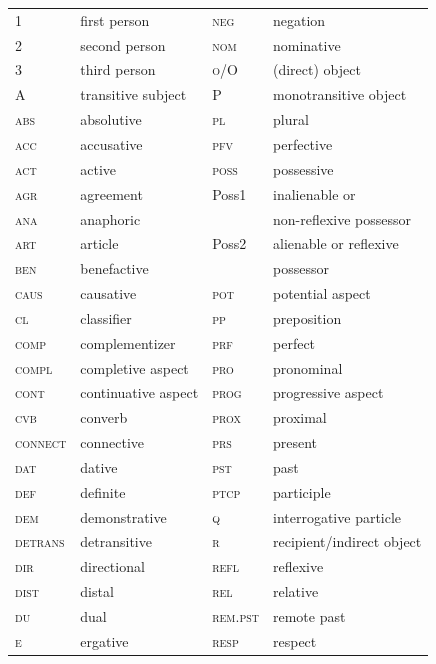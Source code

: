 \documentclass[output=collectionpaper]{langsci/langscibook}
\begin{document}
\begin{tabularx}{\textwidth}{lXlX}
  1	&	first person	&	\textsc{neg}	&	negation	\\
  2	&	second person	&	\textsc{nom}	&	nominative	\\
  3	&	third person	&	\textsc{o}/O	&	(direct) object	\\
  A 	&	transitive subject	&	P 	&	monotransitive object	\\
  \textsc{abs}	&	absolutive	&	\textsc{pl}	&	plural	\\
  \textsc{acc}	&	accusative	&	\textsc{pfv}	&	perfective	\\
  \textsc{act}	&	active	&	\textsc{poss}	&	possessive	\\
  \textsc{agr}	&	agreement	&	Poss1 	&	inalienable or  	\\
  \textsc{ana}	&	anaphoric	&		&	non-reflexive possessor	\\
  \textsc{art}	&	article	&	Poss2	&	alienable or reflexive 	\\
  \textsc{ben}	&	benefactive	&		&	possessor	\\
  \textsc{caus}	&	causative	&	\textsc{pot}	&	potential aspect	\\
  \textsc{cl}	&	classifier	&	\textsc{pp}	&	preposition	\\
  \textsc{comp}	&	complementizer	&	\textsc{prf}	&	perfect	\\
  \textsc{compl}	&	completive aspect	&	\textsc{pro}	&	pronominal	\\
  \textsc{cont}	&	continuative aspect	&	\textsc{prog}	&	progressive aspect	\\
  \textsc{cvb}	&	converb	&	\textsc{prox}	&	proximal	\\
  \textsc{connect}	&	connective	&	\textsc{prs}	&	present	\\
  \textsc{dat}	&	dative	&	\textsc{pst}	&	past	\\
  \textsc{def}	&	definite	&	\textsc{ptcp}	&	participle	\\
  \textsc{dem}	&	demonstrative	&	\textsc{q}	&	interrogative particle	\\
  \textsc{detrans}	&	detransitive	&	\textsc{r}	&	recipient/indirect object	\\
  \textsc{dir}	&	directional	&	\textsc{refl}	&	reflexive	\\
  \textsc{dist}	&	distal	&	\textsc{rel}	&	relative	\\
  \textsc{du}	&	dual	&	\textsc{rem.pst}	&	remote past	\\
  \textsc{e}	&	ergative	&	\textsc{resp}	&	respect	\\

\end{tabularx}
\end{document}
